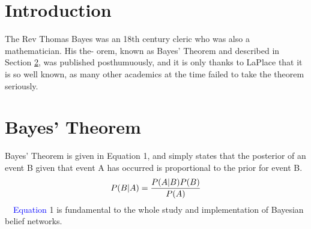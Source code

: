 \documentclass[12pt,a4paper]{article}
\begin{document}
\section{Introduction}
The Rev Thomas Bayes was an 18th century cleric who was also a mathematician. His the- orem, known as Bayes’ Theorem and described in Section \ref{sec:thang}, was published posthumuously, and it is only thanks to LaPlace that it is so well known, as many other academics at the time failed to take the theorem seriously.
\section{Bayes’ Theorem}
\label{sec:thang}
Bayes’ Theorem is given in Equation 1, and simply states that the posterior of an event B given that event A has occurred is proportional to the prior for event B.\\
\begin{equation}
P(B|A) = \dfrac{P(A|B)P(B)}{P(A)}\\
\end{equation}
~~\textcolor{blue} {Equation} 1 is fundamental to the whole study and implementation of Bayesian belief networks.
\end{document}

